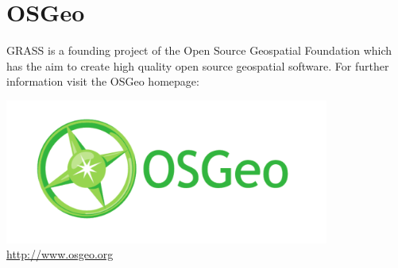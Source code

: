 \documentclass[notumble,a4paper,10pt,nofoldmark]{leaflet}
\begin{document}
\vfill
\section{OSGeo}

GRASS is a founding project of the Open Source Geospatial Foundation which has the aim to create high quality open source geospatial software. For further information visit the OSGeo homepage:
\begin{center}
\includegraphics[width=0.8\textwidth]{pix/OSGeo_CMYK}\\
\url{http://www.osgeo.org}
\end{center}
\end{document}
